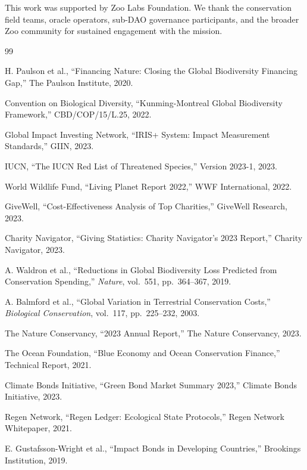 \documentclass[11pt,letterpaper]{article}
\begin{document}
This work was supported by Zoo Labs Foundation. We thank the conservation field teams, oracle operators, sub-DAO governance participants, and the broader Zoo community for sustained engagement with the mission.


\begin{thebibliography}{99}

H. Paulson et al., ``Financing Nature: Closing the Global Biodiversity Financing Gap,'' The Paulson Institute, 2020.

Convention on Biological Diversity, ``Kunming-Montreal Global Biodiversity Framework,'' CBD/COP/15/L.25, 2022.

Global Impact Investing Network, ``IRIS+ System: Impact Measurement Standards,'' GIIN, 2023.

IUCN, ``The IUCN Red List of Threatened Species,'' Version 2023-1, 2023.

World Wildlife Fund, ``Living Planet Report 2022,'' WWF International, 2022.

GiveWell, ``Cost-Effectiveness Analysis of Top Charities,'' GiveWell Research, 2023.

Charity Navigator, ``Giving Statistics: Charity Navigator's 2023 Report,'' Charity Navigator, 2023.

A. Waldron et al., ``Reductions in Global Biodiversity Loss Predicted from Conservation Spending,'' \emph{Nature}, vol.\ 551, pp.\ 364--367, 2019.

A. Balmford et al., ``Global Variation in Terrestrial Conservation Costs,'' \emph{Biological Conservation}, vol.\ 117, pp.\ 225--232, 2003.

The Nature Conservancy, ``2023 Annual Report,'' The Nature Conservancy, 2023.

The Ocean Foundation, ``Blue Economy and Ocean Conservation Finance,'' Technical Report, 2021.

Climate Bonds Initiative, ``Green Bond Market Summary 2023,'' Climate Bonds Initiative, 2023.

Regen Network, ``Regen Ledger: Ecological State Protocols,'' Regen Network Whitepaper, 2021.

E. Gustafsson-Wright et al., ``Impact Bonds in Developing Countries,'' Brookings Institution, 2019.


\end{thebibliography}
\end{document}
